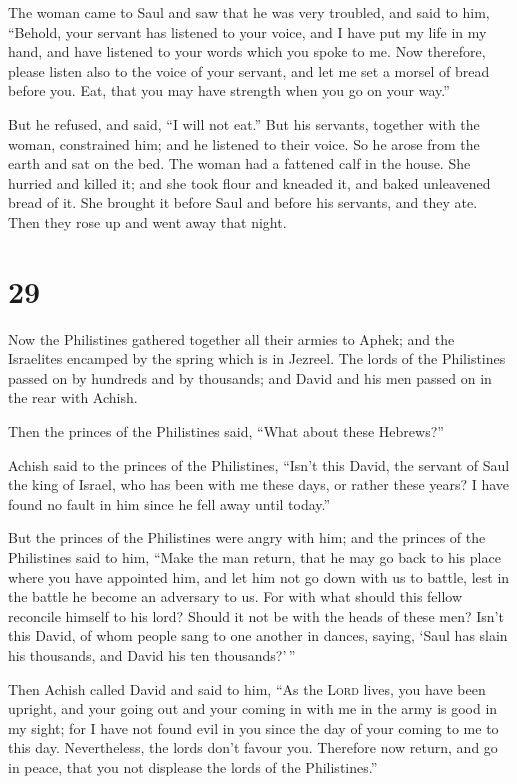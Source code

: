  The woman came to Saul and saw that he was very
troubled, and said to him, ``Behold, your servant has listened to your
voice, and I have put my life in my hand, and have listened to your
words which you spoke to me.  Now therefore, please
listen also to the voice of your servant, and let me set a morsel of
bread before you. Eat, that you may have strength when you go on your
way.''

 But he refused, and said, ``I will not eat.'' But his
servants, together with the woman, constrained him; and he listened to
their voice. So he arose from the earth and sat on the bed.
 The woman had a fattened calf in the house. She hurried
and killed it; and she took flour and kneaded it, and baked unleavened
bread of it.  She brought it before Saul and before his
servants, and they ate. Then they rose up and went away that night.

\hypertarget{section-28}{%
\section{29}\label{section-28}}

 Now the Philistines gathered together all their armies to
Aphek; and the Israelites encamped by the spring which is in Jezreel.
 The lords of the Philistines passed on by hundreds and by
thousands; and David and his men passed on in the rear with Achish.

 Then the princes of the Philistines said, ``What about
these Hebrews?''

Achish said to the princes of the Philistines, ``Isn't this David, the
servant of Saul the king of Israel, who has been with me these days, or
rather these years? I have found no fault in him since he fell away
until today.''

 But the princes of the Philistines were angry with him;
and the princes of the Philistines said to him, ``Make the man return,
that he may go back to his place where you have appointed him, and let
him not go down with us to battle, lest in the battle he become an
adversary to us. For with what should this fellow reconcile himself to
his lord? Should it not be with the heads of these men? 
Isn't this David, of whom people sang to one another in dances, saying,
`Saul has slain his thousands, and David his ten thousands?'\,''

 Then Achish called David and said to him, ``As the
\textsc{Lord} lives, you have been upright, and your going out and your
coming in with me in the army is good in my sight; for I have not found
evil in you since the day of your coming to me to this day.
Nevertheless, the lords don't favour you.  Therefore now
return, and go in peace, that you not displease the lords of the
Philistines.''

